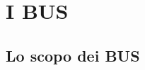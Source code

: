 \section[I BUS]{I BUS}
\label{sec:bus}


%	
%	



\subsection[Lo scopo dei BUS]{Lo scopo dei BUS}



